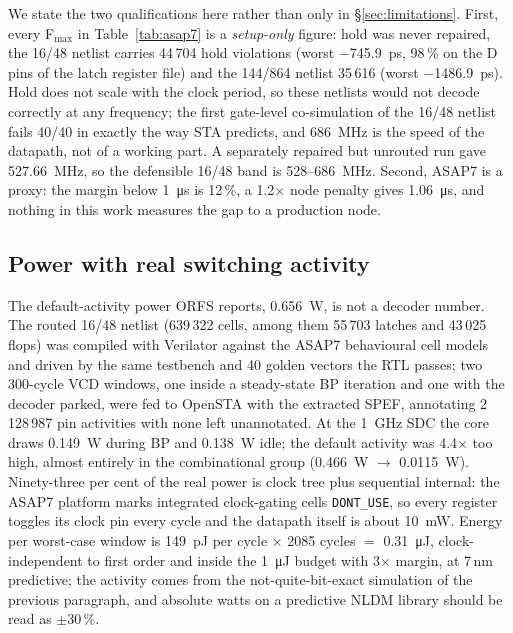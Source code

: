 We state the two qualifications here rather than only in
\S\ref{sec:limitations}. First, every F$_{\max}$ in Table~\ref{tab:asap7} is a
\emph{setup-only} figure: hold was never repaired, the 16/48 netlist carries
44\,704 hold violations (worst \SI{-745.9}{\pico\second}, 98\,\% on the D pins
of the latch register file) and the 144/864 netlist 35\,616 (worst
\SI{-1486.9}{\pico\second}). Hold does not scale with the clock period, so
these netlists would not decode correctly at any frequency; the first
gate-level co-simulation of the 16/48 netlist fails 40/40 in exactly the way
STA predicts, and \SI{686}{\mega\hertz} is the speed of the datapath, not of a
working part. A separately repaired but unrouted run gave
\SI{527.66}{\mega\hertz}, so the defensible 16/48 band is
528--\SI{686}{\mega\hertz}.
Second, ASAP7 is a proxy: the margin below \SI{1}{\micro\second} is 12\,\%, a
1.2$\times$ node penalty gives \SI{1.06}{\micro\second}, and nothing in this
work measures the gap to a production node.

\subsection*{Power with real switching activity}

The default-activity power ORFS reports, \SI{0.656}{\watt}, is not a decoder
number. The routed 16/48 netlist (639\,322 cells, among them 55\,703 latches
and 43\,025 flops) was compiled with Verilator against the ASAP7 behavioural
cell models and driven by the same testbench and 40 golden vectors the RTL
passes; two 300-cycle VCD windows, one inside a steady-state BP iteration and
one with the decoder parked, were fed to OpenSTA with the extracted SPEF,
annotating 2\,128\,987 pin activities with none left unannotated.
At the \SI{1}{\giga\hertz} SDC the core draws \SI{0.149}{\watt} during BP and
\SI{0.138}{\watt} idle; the default activity was 4.4$\times$ too high, almost
entirely in the combinational group (\SI{0.466}{\watt} $\to$
\SI{0.0115}{\watt}). Ninety-three per cent of the real power is clock tree
plus sequential internal: the ASAP7 platform marks integrated clock-gating
cells \texttt{DONT\_USE}, so every register toggles its clock pin every cycle
and the datapath itself is about \SI{10}{\milli\watt}. Energy per worst-case
window is \SI{149}{\pico\joule} per cycle $\times$ 2085 cycles $=$
\SI{0.31}{\micro\joule}, clock-independent to first order and inside the
\SI{1}{\micro\joule} budget with 3$\times$ margin, at 7\,nm predictive; the
activity comes from the not-quite-bit-exact simulation of the previous
paragraph, and absolute watts on a predictive NLDM library should be read as
$\pm30\,\%$.

